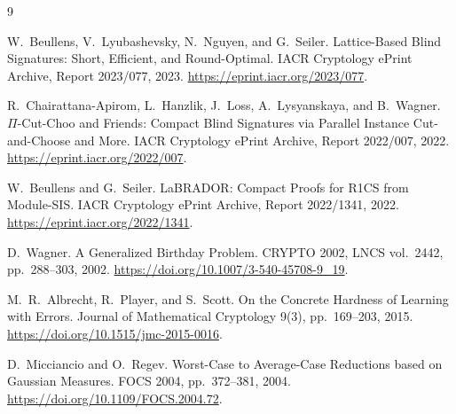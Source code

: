 \documentclass[11pt]{article}
\begin{document}
\begin{thebibliography}{9}

W.~Beullens, V.~Lyubashevsky, N.~Nguyen, and G.~Seiler.
\newblock Lattice-Based Blind Signatures: Short, Efficient, and Round-Optimal.
\newblock IACR Cryptology ePrint Archive, Report 2023/077, 2023.
\newblock \url{https://eprint.iacr.org/2023/077}.

R.~Chairattana-Apirom, L.~Hanzlik, J.~Loss, A.~Lysyanskaya, and B.~Wagner.
\newblock $\Pi$-Cut-Choo and Friends: Compact Blind Signatures via Parallel
Instance Cut-and-Choose and More.
\newblock IACR Cryptology ePrint Archive, Report 2022/007, 2022.
\newblock \url{https://eprint.iacr.org/2022/007}.

W.~Beullens and G.~Seiler.
\newblock LaBRADOR: Compact Proofs for R1CS from Module-SIS.
\newblock IACR Cryptology ePrint Archive, Report 2022/1341, 2022.
\newblock \url{https://eprint.iacr.org/2022/1341}.

D.~Wagner.
\newblock A Generalized Birthday Problem.
\newblock CRYPTO 2002, LNCS vol.~2442, pp.~288--303, 2002.
\newblock \url{https://doi.org/10.1007/3-540-45708-9_19}.

M.~R.~Albrecht, R.~Player, and S.~Scott.
\newblock On the Concrete Hardness of Learning with Errors.
\newblock Journal of Mathematical Cryptology 9(3), pp.~169--203, 2015.
\newblock \url{https://doi.org/10.1515/jmc-2015-0016}.

D.~Micciancio and O.~Regev.
\newblock Worst-Case to Average-Case Reductions based on Gaussian Measures.
\newblock FOCS 2004, pp.~372--381, 2004.
\newblock \url{https://doi.org/10.1109/FOCS.2004.72}.

\end{thebibliography}
\end{document}
